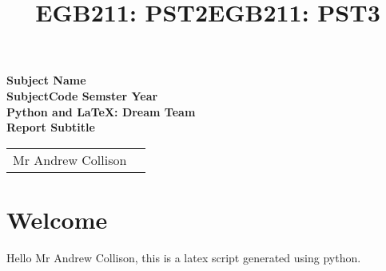 \documentclass[11pt]{article}
\title{EGB211: PST2}
\begin{document}
\title{EGB211: PST3}
\begin{titlepage}
\begin{center}
\vspace{1cm}
\large{\textbf{Subject Name}}\\
\large{\textbf{SubjectCode Semster Year}}\\
\vfill
\huge{\textbf{Python and LaTeX: Dream Team}}\\
\large{\textbf{Report Subtitle }}
\vfill
\begin{table}[h]
\centering
\begin{tabular}{cc}
Mr Andrew Collison        \\ 
\end{tabular}
\end{table}

\vspace{5mm}
\end{center}  
\end{titlepage}

\section{Welcome}

Hello Mr Andrew Collison, this is a latex script generated using python.
\end{document}

